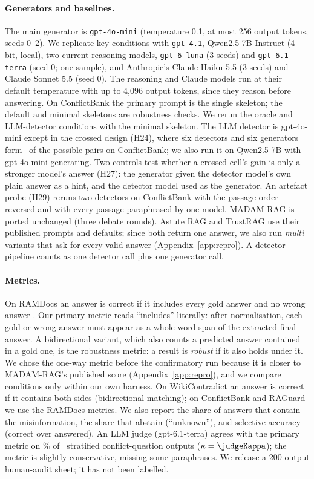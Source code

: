 \paragraph{Generators and baselines.}
The main generator is \texttt{gpt-4o-mini} \citep{openai2024gpt4o} (temperature 0.1, at most 256 output tokens, seeds
0--2). We replicate key conditions with \texttt{gpt-4.1}, Qwen2.5-7B-Instruct \citep{yang2024qwen25} (4-bit, local),
two current reasoning models, \texttt{gpt-6-luna} (3 seeds) and \texttt{gpt-6.1-terra} (seed 0; one sample), and Anthropic's
Claude Haiku 5.5 (3 seeds) and Claude Sonnet 5.5 (seed 0). The reasoning and Claude models run at their default
temperature with up to 4,096 output tokens, since they reason before answering. On ConflictBank the primary prompt is
the single skeleton; the default and minimal skeletons are robustness checks. We rerun the oracle and LLM-detector
conditions with the minimal skeleton.
The LLM detector is gpt-4o-mini except in the crossed design (H24), where six detectors and six generators form
\hTwentyFourCells\ of the possible pairs on ConflictBank; we also run it on Qwen2.5-7B with gpt-4o-mini generating. Two controls test
whether a crossed cell's gain is only a stronger model's answer (H27): the generator given the detector model's own
plain answer as a hint, and the detector model used as the generator. An artefact probe (H29) reruns two detectors on
ConflictBank with the passage order reversed and with every passage paraphrased by one model.
MADAM-RAG \citep{wang2025madam} is ported unchanged (three debate rounds). Astute RAG \citep{wang2025astute} and
TrustRAG \citep{zhou2025trustrag} use their published prompts and defaults; since both return one answer, we also run
\emph{multi} variants that ask for every valid answer (Appendix~\ref{app:repro}). A detector pipeline counts as one
detector call plus one generator call.

\paragraph{Metrics.}
On RAMDocs an answer is correct if it includes every gold answer and no wrong answer \citep{wang2025madam}. Our primary
metric reads ``includes'' literally: after normalisation, each gold or wrong answer must appear as a whole-word span
of the extracted final answer. A bidirectional variant, which also counts a predicted answer contained in a gold one,
is the robustness metric: a result is \emph{robust} if it also holds under it. We chose the one-way metric before the confirmatory run because it is closer to MADAM-RAG's
published score (Appendix~\ref{app:repro}), and we compare conditions only within our own harness. On WikiContradict
an answer is correct if it contains both sides (bidirectional matching); on ConflictBank and RAGuard we use the RAMDocs metrics. We also report
the share of answers that contain the misinformation, the share that abstain (``unknown''), and selective accuracy (correct over
answered). An LLM judge (gpt-6.1-terra) agrees with the primary metric on \judgeAgree\% of \judgeN\ stratified
conflict-question outputs ($\kappa=\judgeKappa$); the metric is slightly conservative, missing some paraphrases. We
release a 200-output human-audit sheet; it has not been labelled.

